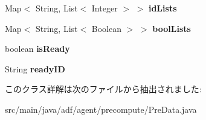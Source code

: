 \begin{DoxyCompactItemize}
Map$<$ String, List$<$ Integer $>$ $>$ {\bfseries id\+Lists}
\item 
\hypertarget{classadf_1_1agent_1_1precompute_1_1PreData_a2085142edc1e664e43922ce3963f4b0f}{}\label{classadf_1_1agent_1_1precompute_1_1PreData_a2085142edc1e664e43922ce3963f4b0f} 
Map$<$ String, List$<$ Boolean $>$ $>$ {\bfseries bool\+Lists}
\item 
\hypertarget{classadf_1_1agent_1_1precompute_1_1PreData_ad35a114c17b59c4102b9a24f19a84890}{}\label{classadf_1_1agent_1_1precompute_1_1PreData_ad35a114c17b59c4102b9a24f19a84890} 
boolean {\bfseries is\+Ready}
\item 
\hypertarget{classadf_1_1agent_1_1precompute_1_1PreData_a7902f6fc367e2a842ffde5d29a469940}{}\label{classadf_1_1agent_1_1precompute_1_1PreData_a7902f6fc367e2a842ffde5d29a469940} 
String {\bfseries ready\+ID}
\end{DoxyCompactItemize}


このクラス詳解は次のファイルから抽出されました\+:\begin{DoxyCompactItemize}
\item 
src/main/java/adf/agent/precompute/Pre\+Data.\+java\end{DoxyCompactItemize}
